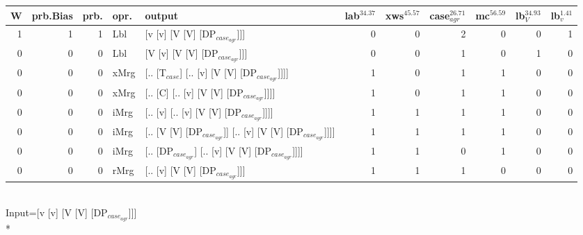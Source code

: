 \begin{tabularx}{\linewidth}{rrrlXrrrrrr}
\hline
   W &   prb.Bias &   prb. & opr.   & output                                                    &   lab$^{34.37}$ &   xws$^{45.57}$ &   case$_{agr}^{26.71}$ &   mc$^{56.59}$ &   lb$_{V}^{34.93}$ &   lb$_{v}^{1.41}$ \\
\hline
   1 &       1 &   1 & Lbl  & [v [v] [V [V] [DP$_{case_{agr}}$]]]                             &             0 &             0 &                  2 &            0 &              0 &             1 \\
   0 &       0 &   0 & Lbl  & [V [v] [V [V] [DP$_{case_{agr}}$]]]                             &             0 &             0 &                  1 &            0 &              1 &             0 \\
   0 &       0 &   0 & xMrg & [.. [T$_{case}$] [.. [v] [V [V] [DP$_{case_{agr}}$]]]]              &             1 &             0 &                  1 &            1 &              0 &             0 \\
   0 &       0 &   0 & xMrg & [.. [C] [.. [v] [V [V] [DP$_{case_{agr}}$]]]]                   &             1 &             0 &                  1 &            1 &              0 &             0 \\
   0 &       0 &   0 & iMrg & [.. [v] [.. [v] [V [V] [DP$_{case_{agr}}$]]]]                   &             1 &             1 &                  1 &            1 &              0 &             0 \\
   0 &       0 &   0 & iMrg & [.. [V [V] [DP$_{case_{agr}}$]] [.. [v] [V [V] [DP$_{case_{agr}}$]]]] &             1 &             1 &                  1 &            1 &              0 &             0 \\
   0 &       0 &   0 & iMrg & [.. [DP$_{case_{agr}}$] [.. [v] [V [V] [DP$_{case_{agr}}$]]]]         &             1 &             1 &                  0 &            1 &              0 &             0 \\
   0 &       0 &   0 & rMrg & [.. [v] [V [V] [DP$_{case_{agr}}$]]]                            &             1 &             1 &                  1 &            0 &              0 &             0 \\
\hline
\end{tabularx}\endgroup\\
\begingroup\scriptsize Input=[v [v] [V [V] [DP$_{case_{agr}}$]]]\\*
